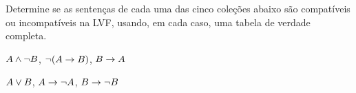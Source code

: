 \problempart
\label{pr.TT.satisfiable2}
Determine se as sentenças de cada uma das cinco coleções abaixo são compatíveis ou incompatíveis na LVF, usando, em cada caso, uma tabela de verdade completa.
\begin{earg}
\item $A \wedge \neg B$, $\neg(A \rightarrow B)$, $B \rightarrow A$\vspace{.5ex} %


\item $A \vee B$, $A \rightarrow \neg A$, $B \rightarrow \neg B$ \vspace{.5ex}%



\end{earg}
